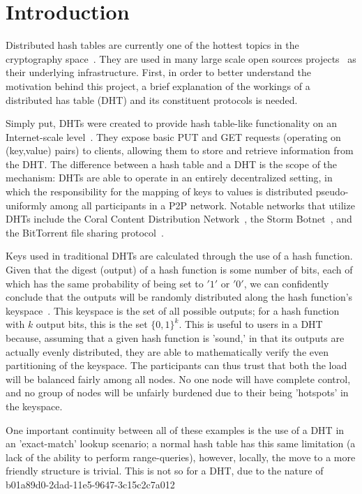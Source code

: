 \documentclass[12pt]{article}
\begin{document}
\section{Introduction}
\par Distributed hash tables are currently one of the hottest topics in the cryptography space~\cite{Stoica:2001dj,Rowstron:2001ea,Ratnasamy:2001wn}. They are used in many large scale open sources projects~\cite{Freitas:2013tb,Xu:2010vs,Perfitt:2010fh} as their underlying infrastructure. First, in order to better understand the motivation behind this project, a brief explanation of the workings of a distributed has table (DHT) and its constituent protocols is needed.

\par Simply put, DHTs were created to provide hash table-like functionality on an Internet-scale level~\cite{Ratnasamy:2001wn}. They expose basic PUT and GET requests (operating on (key,value) pairs) to clients, allowing them to store and retrieve information from the DHT. The difference between a hash table and a DHT is the scope of the mechanism: DHTs are able to operate in an entirely decentralized setting, in which the responsibility for the mapping of keys to values is distributed pseudo-uniformly among all participants in a P2P network. Notable networks that utilize DHTs include the Coral Content Distribution Network~\cite{Freedman:2004vb}, the Storm Botnet~\cite{Holz:2008uk}, and the BitTorrent file sharing protocol~\cite{Cohen:y1_8mBnw}.

\par Keys used in traditional DHTs are calculated through the use of a hash function. Given that the digest (output) of a hash function is some number of bits, each of which has the same probability of being set to $'1'$ or $'0'$, we can confidently conclude that the outputs will be randomly distributed along the hash function's keyspace~. This keyspace is the set of all possible outputs; for a hash function with $k$ output bits, this is the set $\{0,1\}^k$. This is useful to users in a DHT because, assuming that a given hash function is 'sound,' in that its outputs are actually evenly distributed, they are able to mathematically verify the even partitioning of the keyspace. The participants can thus trust that both the load will be balanced fairly among all nodes. No one node will have complete control, and no group of nodes will be unfairly burdened due to their being 'hotspots' in the keyspace.~

\par One important continuity between all of these examples is the use of a DHT in an 'exact-match' lookup scenario; a normal hash table has this same limitation (a lack of the ability to perform range-queries), however, locally, the move to a more friendly structure is trivial. This is not so for a DHT, due to the nature of
\printbibliography
b01a89d0-2dad-11e5-9647-3c15c2c7a012
\end{document}

